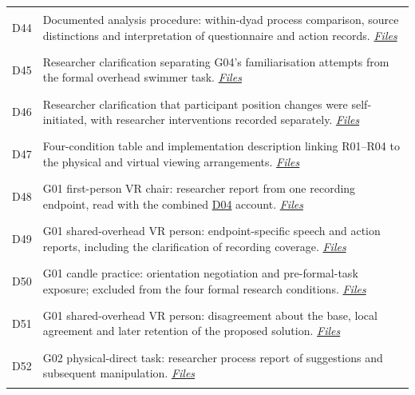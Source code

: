\begin{longtable}{@{}p{14mm}>{\raggedright\arraybackslash}p{140mm}@{}}
\hypertarget{src:D44}{}\label{src:D44}D44 & Documented analysis procedure: within-dyad process comparison, source distinctions and interpretation of questionnaire and action records. \href{https://github.com/YiyangQin-UQ/REIT7841/blob/main/thesis/v1.1/materials/README.md\#d44}{\textit{Files}} \\
\hypertarget{src:D45}{}\label{src:D45}D45 & Researcher clarification separating G04's familiarisation attempts from the formal overhead swimmer task. \href{https://github.com/YiyangQin-UQ/REIT7841/blob/main/thesis/v1.1/materials/README.md\#d45}{\textit{Files}} \\
\hypertarget{src:D46}{}\label{src:D46}D46 & Researcher clarification that participant position changes were self-initiated, with researcher interventions recorded separately. \href{https://github.com/YiyangQin-UQ/REIT7841/blob/main/thesis/v1.1/materials/README.md\#d46}{\textit{Files}} \\
\hypertarget{src:D47}{}\label{src:D47}D47 & Four-condition table and implementation description linking R01--R04 to the physical and virtual viewing arrangements. \href{https://github.com/YiyangQin-UQ/REIT7841/blob/main/thesis/v1.1/materials/README.md\#d47}{\textit{Files}} \\
\hypertarget{src:D48}{}\label{src:D48}D48 & G01 first-person VR chair: researcher report from one recording endpoint, read with the combined \hyperlink{src:D04}{D04} account. \href{https://github.com/YiyangQin-UQ/REIT7841/blob/main/thesis/v1.1/materials/README.md\#d48}{\textit{Files}} \\
\hypertarget{src:D49}{}\label{src:D49}D49 & G01 shared-overhead VR person: endpoint-specific speech and action reports, including the clarification of recording coverage. \href{https://github.com/YiyangQin-UQ/REIT7841/blob/main/thesis/v1.1/materials/README.md\#d49}{\textit{Files}} \\
\hypertarget{src:D50}{}\label{src:D50}D50 & G01 candle practice: orientation negotiation and pre-formal-task exposure; excluded from the four formal research conditions. \href{https://github.com/YiyangQin-UQ/REIT7841/blob/main/thesis/v1.1/materials/README.md\#d50}{\textit{Files}} \\
\hypertarget{src:D51}{}\label{src:D51}D51 & G01 shared-overhead VR person: disagreement about the base, local agreement and later retention of the proposed solution. \href{https://github.com/YiyangQin-UQ/REIT7841/blob/main/thesis/v1.1/materials/README.md\#d51}{\textit{Files}} \\
\hypertarget{src:D52}{}\label{src:D52}D52 & G02 physical-direct task: researcher process report of suggestions and subsequent manipulation. \href{https://github.com/YiyangQin-UQ/REIT7841/blob/main/thesis/v1.1/materials/README.md\#d52}{\textit{Files}} \\

\end{longtable}
